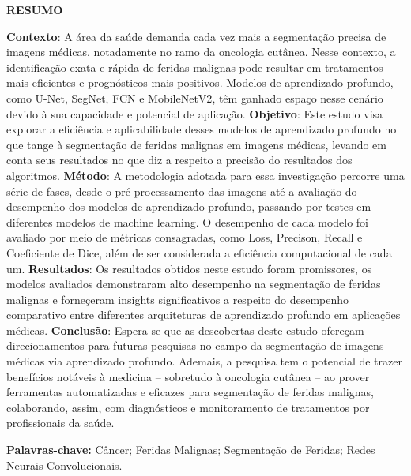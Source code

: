 \begin{center}
    \textbf{RESUMO}
\end{center}

\textbf{Contexto}: A área da saúde demanda cada vez mais a segmentação precisa de imagens médicas, notadamente no ramo da oncologia cutânea. Nesse contexto, a identificação exata e rápida de feridas malignas pode resultar em tratamentos mais eficientes e prognósticos mais positivos. Modelos de aprendizado profundo, como \acf{U-Net}, \acf{SegNet}, \acf{FCN} e \acf{MobileNetV2}, têm ganhado espaço nesse cenário devido à sua capacidade e potencial de aplicação. \textbf{Objetivo}: Este estudo visa explorar a eficiência e aplicabilidade desses modelos de aprendizado profundo no que tange à segmentação de feridas malignas em imagens médicas, levando em conta seus resultados no que diz a respeito a precisão do resultados dos algoritmos. \textbf{Método}: A metodologia adotada para essa investigação percorre uma série de fases, desde o pré-processamento das imagens até a avaliação do desempenho dos modelos de aprendizado profundo, passando por testes em diferentes modelos de machine learning. O desempenho de cada modelo foi avaliado por meio de métricas consagradas, como Loss, Precison, Recall e Coeficiente de Dice, além de ser considerada a eficiência computacional de cada um. \textbf{Resultados}: Os resultados obtidos neste estudo foram promissores, os modelos avaliados demonstraram alto desempenho na segmentação de feridas malignas e forneçeram insights significativos a respeito do desempenho comparativo entre diferentes arquiteturas de aprendizado profundo em aplicações médicas. \textbf{Conclusão}: Espera-se que as descobertas deste estudo ofereçam direcionamentos para futuras pesquisas no campo da segmentação de imagens médicas via aprendizado profundo. Ademais, a pesquisa tem o potencial de trazer benefícios notáveis à medicina -- sobretudo à oncologia cutânea -- ao prover ferramentas automatizadas e eficazes para segmentação de feridas malignas, colaborando, assim, com diagnósticos e monitoramento de tratamentos por profissionais da saúde.

\textbf{Palavras-chave:}  Câncer; Feridas Malignas; Segmentação de Feridas; Redes Neurais Convolucionais.
